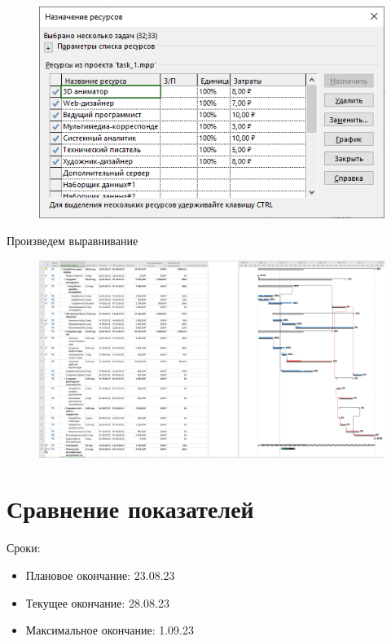 \begin{figure}[H]
	\begin{center}
		\includegraphics[width=\textwidth]{imgs/task_1_19.png}
	\end{center}
\end{figure}

Произведем выравнивание

\begin{figure}[H]
	\begin{center}
		\includegraphics[width=\textwidth]{imgs/task_1_20.png}
	\end{center}
\end{figure}

\section*{Сравнение показателей}

Сроки:

\begin{itemize}
	\item Плановое окончание: 23.08.23
	\item Текущее окончание: 28.08.23
	\item Максимальное окончание: 1.09.23
\end{itemize}

